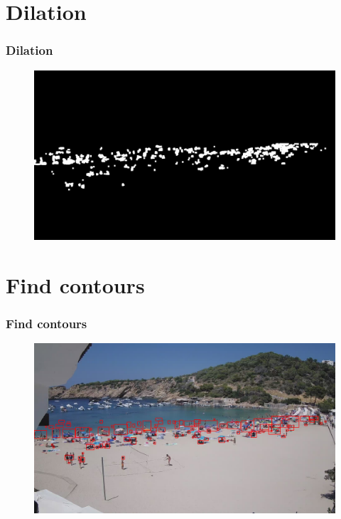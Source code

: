 \documentclass{beamer}
\begin{document}
\section{Dilation}
\begin{frame}
    \frametitle{Dilation}

    \begin{figure}
        \centering
        \includegraphics[width=\textwidth]{../gen/dil/1660305600.jpg}
    \end{figure}

    
\end{frame}

\section{Find contours}
\begin{frame}
    \frametitle{Find contours}
    \begin{figure}
        \centering
        \includegraphics[width=\textwidth]{../gen/det/1660305600.jpg}
    \end{figure}
\end{frame}
\end{document}
